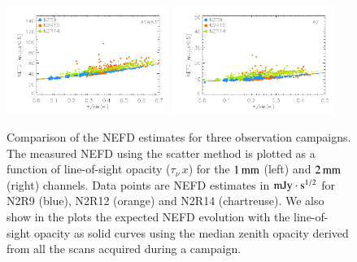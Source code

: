 \documentclass[traditionalabstract]{aa}
\newcommand{\taunu}{\tau_{\nu}}
\begin{document}
\begin{figure}[!thbp]
\begin{center}
\includegraphics[clip=true,width=0.47\textwidth]{Figures/plot_nefd_vs_obstau_corrected_skydip_vfinal_1mm.pdf}
\includegraphics[clip=true,width=0.47\textwidth]{Figures/plot_nefd_vs_obstau_corrected_skydip_vfinal_a2.pdf}
\caption{Comparison of the NEFD estimates for three observation
  campaigns. The measured NEFD using the scatter method is plotted as a function of
  line-of-sight opacity ($\taunu\,x$) for the $1\,\rm{mm}$ (left) and $2\,\rm{mm}$ (right)
  channels. Data points are NEFD estimates in $\rm{mJy}\cdot s^{1/2}$ for N2R9 (blue), N2R12 (orange)
  and N2R14 (chartreuse). We also show in the plots the expected NEFD evolution
  with the line-of-sight opacity as solid curves using the median
  zenith opacity derived from all the scans acquired during a campaign.}
\label{fig:nefdvsbackground_below_1Jy}
\end{center}
\end{figure}
\end{document}
